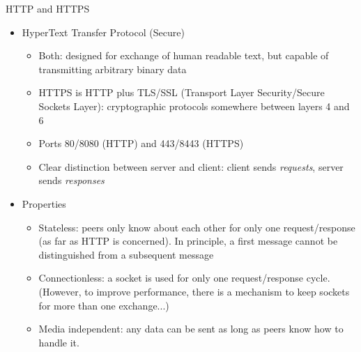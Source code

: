 \begin{frame}{HTTP and HTTPS}
%
\begin{itemize}
\item HyperText Transfer Protocol (Secure)
	\begin{itemize}
	\item Both: designed for exchange of human readable text, but capable of transmitting arbitrary binary data
	\item HTTPS is HTTP plus TLS/SSL (Transport Layer Security/Secure Sockets Layer): cryptographic protocols somewhere between layers 4 and 6
	\item Ports 80/8080 (HTTP) and 443/8443 (HTTPS)
	\item Clear distinction between server and client: client sends \emph{requests}, server sends \emph{responses}
	\end{itemize}
\pause
\item Properties
	\begin{itemize}
	\item Stateless: peers only know about each other for only one request/response (as far as HTTP is concerned).
		In principle, a first message cannot be distinguished from a subsequent message
	\item Connectionless: a socket is used for only one request/response cycle.\\
		(However, to improve performance, there is a mechanism to keep sockets for more than one exchange...)
	\item Media independent: any data can be sent as long as peers know how to handle it.
	\end{itemize}
\end{itemize}
%
\end{frame}


